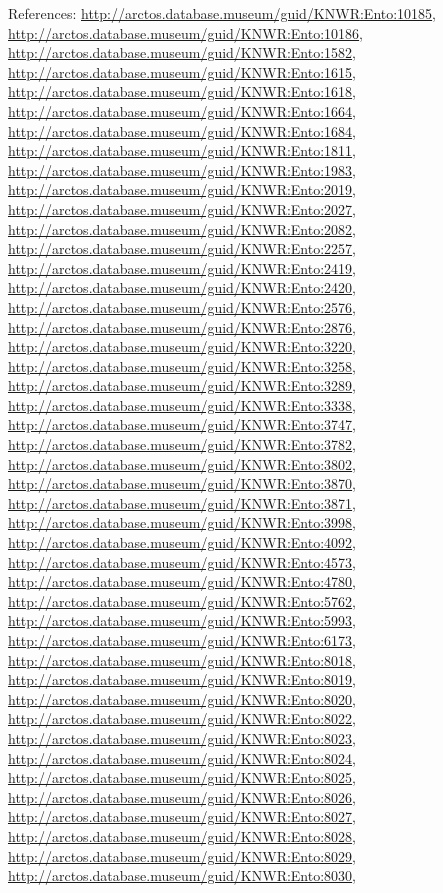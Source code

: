 \documentclass[9pt, article]{memoir}
\begin{document}
\begin{multicols}{2}
References: 
\url{http://arctos.database.museum/guid/KNWR:Ento:10185}, 
\url{http://arctos.database.museum/guid/KNWR:Ento:10186}, 
\url{http://arctos.database.museum/guid/KNWR:Ento:1582}, 
\url{http://arctos.database.museum/guid/KNWR:Ento:1615}, 
\url{http://arctos.database.museum/guid/KNWR:Ento:1618}, 
\url{http://arctos.database.museum/guid/KNWR:Ento:1664}, 
\url{http://arctos.database.museum/guid/KNWR:Ento:1684}, 
\url{http://arctos.database.museum/guid/KNWR:Ento:1811}, 
\url{http://arctos.database.museum/guid/KNWR:Ento:1983}, 
\url{http://arctos.database.museum/guid/KNWR:Ento:2019}, 
\url{http://arctos.database.museum/guid/KNWR:Ento:2027}, 
\url{http://arctos.database.museum/guid/KNWR:Ento:2082}, 
\url{http://arctos.database.museum/guid/KNWR:Ento:2257}, 
\url{http://arctos.database.museum/guid/KNWR:Ento:2419}, 
\url{http://arctos.database.museum/guid/KNWR:Ento:2420}, 
\url{http://arctos.database.museum/guid/KNWR:Ento:2576}, 
\url{http://arctos.database.museum/guid/KNWR:Ento:2876}, 
\url{http://arctos.database.museum/guid/KNWR:Ento:3220}, 
\url{http://arctos.database.museum/guid/KNWR:Ento:3258}, 
\url{http://arctos.database.museum/guid/KNWR:Ento:3289}, 
\url{http://arctos.database.museum/guid/KNWR:Ento:3338}, 
\url{http://arctos.database.museum/guid/KNWR:Ento:3747}, 
\url{http://arctos.database.museum/guid/KNWR:Ento:3782}, 
\url{http://arctos.database.museum/guid/KNWR:Ento:3802}, 
\url{http://arctos.database.museum/guid/KNWR:Ento:3870}, 
\url{http://arctos.database.museum/guid/KNWR:Ento:3871}, 
\url{http://arctos.database.museum/guid/KNWR:Ento:3998}, 
\url{http://arctos.database.museum/guid/KNWR:Ento:4092}, 
\url{http://arctos.database.museum/guid/KNWR:Ento:4573}, 
\url{http://arctos.database.museum/guid/KNWR:Ento:4780}, 
\url{http://arctos.database.museum/guid/KNWR:Ento:5762}, 
\url{http://arctos.database.museum/guid/KNWR:Ento:5993}, 
\url{http://arctos.database.museum/guid/KNWR:Ento:6173}, 
\url{http://arctos.database.museum/guid/KNWR:Ento:8018}, 
\url{http://arctos.database.museum/guid/KNWR:Ento:8019}, 
\url{http://arctos.database.museum/guid/KNWR:Ento:8020}, 
\url{http://arctos.database.museum/guid/KNWR:Ento:8022}, 
\url{http://arctos.database.museum/guid/KNWR:Ento:8023}, 
\url{http://arctos.database.museum/guid/KNWR:Ento:8024}, 
\url{http://arctos.database.museum/guid/KNWR:Ento:8025}, 
\url{http://arctos.database.museum/guid/KNWR:Ento:8026}, 
\url{http://arctos.database.museum/guid/KNWR:Ento:8027}, 
\url{http://arctos.database.museum/guid/KNWR:Ento:8028}, 
\url{http://arctos.database.museum/guid/KNWR:Ento:8029}, 
\url{http://arctos.database.museum/guid/KNWR:Ento:8030}, 

\end{multicols}
\end{document}
